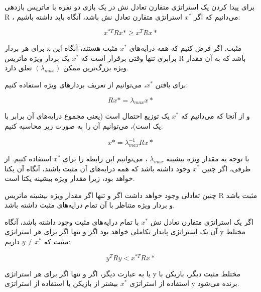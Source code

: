برای پیدا کردن یک استراتژی متقارن تعادل نش در یک بازی دو نفره با ماتریس بازدهی R ، می‌دانیم که اگر 
$x^{*}$
استراتژی متقارن تعادل نش باشد، آنگاه باید داشته باشیم:

\[ x^{*T}Rx* \geq x^{T}Rx* \]

برای هر بردار x مثبت. اگر فرض کنیم که همه درایه‌های
$x^{*}$
مثبت هستند، آنگاه این برابری تنها وقتی برقرار است که
$x^{*}$
یک بردار ویژه ماتریس R باشد که به آن مقدار ویژه بزرگ‌ترین ممکن
$(\lambda_{max})$
تعلق دارد.

برای یافتن $x^{*}$، می‌توانیم از تعریف بردارهای ویژه استفاده کنیم:

\[ Rx* = \lambda_{max} x* \]

و از آنجا که می‌دانیم که
$x^{*}$
یک توزیع احتمال است (یعنی مجموع درایه‌های آن برابر با یک است)، می‌توانیم آن را به صورت زیر محاسبه کنیم:

\[ x* = \lambda_{max}^{-1}Rx* \]

با توجه به مقدار ویژه بیشینه
$\lambda_{max}$
، می‌توانیم این رابطه را برای
$x^{*}$
استفاده کنیم. از طرفی، اگر چنین
$x^{*}$
وجود داشته باشد که همه درایه‌های آن مثبت باشند، آنگاه آن یکتا خواهد بود، زیرا مقدار ویژه بیشینه یکتا است.

چنین تعادلی وجود خواهد داشت اگر و تنها اگر مقدار ویژه بیشینه ماتریس R مثبت باشد و بردار ویژه متناظر با آن تمام درایه‌های مثبت داشته باشد. 

اگر یک استراتژی متقارن تعادل نش
$x^{*}$
با تمام درایه‌های مثبت وجود داشته باشد، آنگاه آن یک استراتژی پایدار تکاملی خواهد بود اگر و تنها اگر برای هر استراتژی y مختلط مثبت که
$y \neq x^{*}$
داریم:

\[ y^{T}Ry < x^{*T}Rx* \]

یا به عبارت دیگر، اگر و تنها اگر برای هر استراتژی y مختلط مثبت دیگر، بازیکن با استفاده از استراتژی
$x^{*}$
بیشتر از بازیکن با استفاده از استراتژی y برنده می‌شود.
